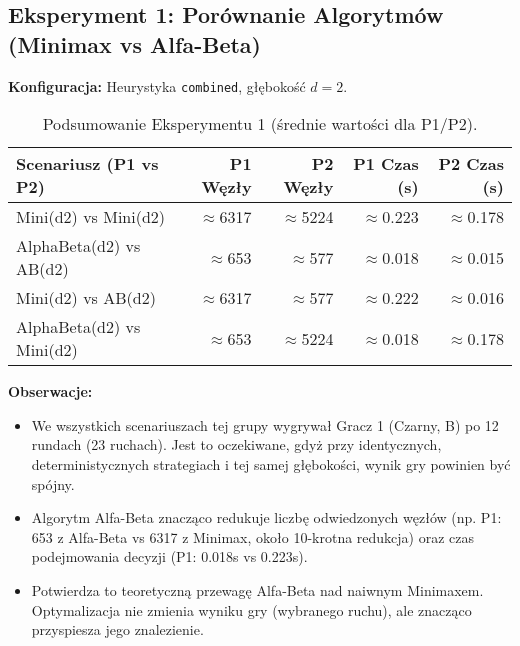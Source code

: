 \documentclass[12pt,a4paper]{article}
\newcommand{\code}[1]{\texttt{#1}} %
\begin{document}
\subsection{Eksperyment 1: Porównanie Algorytmów (Minimax vs Alfa-Beta)}
\textbf{Konfiguracja:} Heurystyka \code{combined}, głębokość $d=2$.
\begin{table}[H]
    \centering
    \caption{Podsumowanie Eksperymentu 1 (średnie wartości dla P1/P2).}
    \begin{tabular}{lrrrr}
        \toprule
        Scenariusz (P1 vs P2) & P1 Węzły & P2 Węzły & P1 Czas (s) & P2 Czas (s) \\
        \midrule
        Mini(d2) vs Mini(d2)     & $\approx$6317 & $\approx$5224 & $\approx$0.223 & $\approx$0.178 \\
        AlphaBeta(d2) vs AB(d2)  & $\approx$653  & $\approx$577  & $\approx$0.018 & $\approx$0.015 \\
        Mini(d2) vs AB(d2)       & $\approx$6317 & $\approx$577  & $\approx$0.222 & $\approx$0.016 \\
        AlphaBeta(d2) vs Mini(d2)& $\approx$653  & $\approx$5224 & $\approx$0.018 & $\approx$0.178 \\
        \bottomrule
    \end{tabular}
    \label{tab:e1_summary}
\end{table}
\textbf{Obserwacje:}
\begin{itemize}
    \item We wszystkich scenariuszach tej grupy wygrywał Gracz 1 (Czarny, B) po 12 rundach (23 ruchach). Jest to oczekiwane, gdyż przy identycznych, deterministycznych strategiach i tej samej głębokości, wynik gry powinien być spójny.
    \item Algorytm Alfa-Beta znacząco redukuje liczbę odwiedzonych węzłów (np. P1: 653 z Alfa-Beta vs 6317 z Minimax, około 10-krotna redukcja) oraz czas podejmowania decyzji (P1: 0.018s vs 0.223s).
    \item Potwierdza to teoretyczną przewagę Alfa-Beta nad naiwnym Minimaxem. Optymalizacja nie zmienia wyniku gry (wybranego ruchu), ale znacząco przyspiesza jego znalezienie.
\end{itemize}
\end{document}

